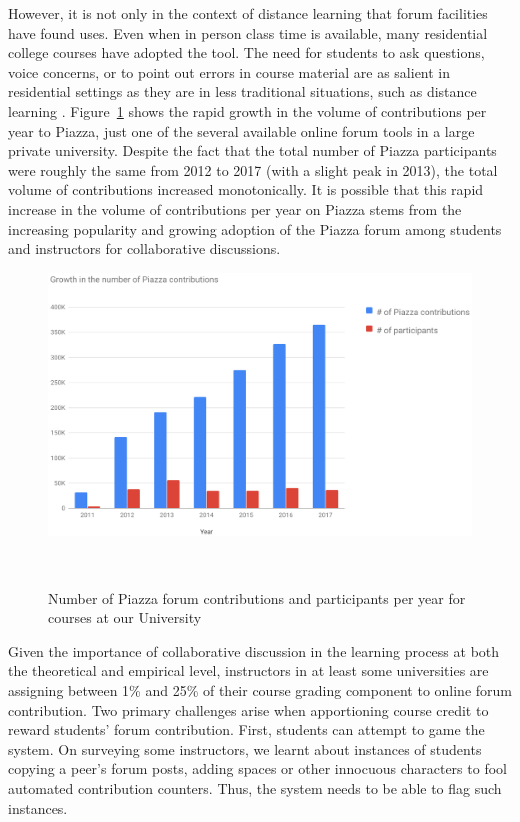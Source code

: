 However, it is not only in the context of distance learning that forum
facilities have found uses. Even when in person class time is
available, many residential college courses have adopted the tool. The
need for students to ask questions, voice concerns, or to point out
errors in course material are as salient in residential settings as
they are in less traditional situations, such as distance learning \cite{andresen2009asynchronous}. 
Figure~\ref{fig:forumGrowth} shows the rapid growth in the volume of contributions per year to
Piazza, just one of the several available online forum tools in a large private university. Despite the fact that the total number of Piazza participants were roughly the same from 2012 to 2017 (with a slight peak in 2013), the total volume of contributions increased monotonically. It is possible that this rapid increase in the volume of contributions per year on Piazza stems from the increasing popularity and growing adoption of the Piazza forum among students and instructors for collaborative discussions. 
\begin{figure}
\centering
  \includegraphics[width=1.0\columnwidth]{Figs/growth2}
  \caption{Number of Piazza forum contributions and participants per year for courses at our University }~\label{fig:forumGrowth}
\end{figure}

Given the importance of collaborative discussion in the learning
process at both the theoretical and empirical level, instructors in at
least some universities are assigning between 1\% and 25\% of their course grading component to online forum contribution. %
Two primary challenges arise when apportioning course credit to reward students' forum contribution. First, students can attempt to game the system. On surveying some instructors, we learnt about instances of students copying a peer's forum posts, adding spaces or
other innocuous characters to fool automated contribution counters. Thus, the system needs to be able to flag such instances.

